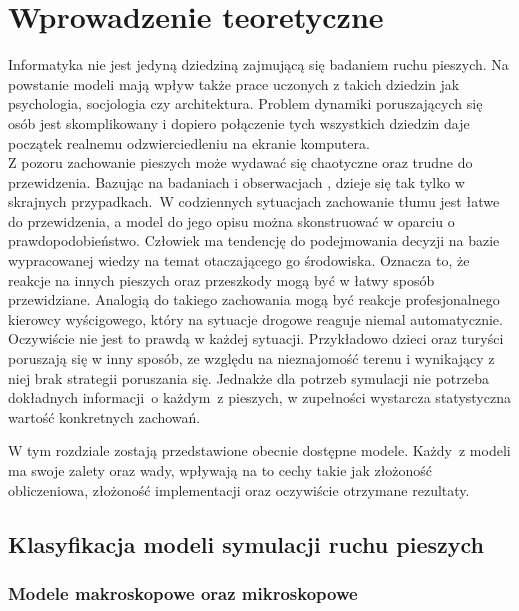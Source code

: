 \chapter{Wprowadzenie teoretyczne}
\label{cha:wprowadzenieTeoretyczne}

Informatyka nie jest jedyną dziedziną zajmującą się badaniem ruchu pieszych. Na powstanie modeli mają wpływ także prace uczonych z takich dziedzin jak psychologia, socjologia czy architektura. Problem dynamiki poruszających się osób jest skomplikowany i dopiero połączenie tych wszystkich dziedzin daje początek realnemu odzwierciedleniu na ekranie komputera. \\
Z pozoru zachowanie pieszych może wydawać się chaotyczne oraz trudne do przewidzenia. Bazując na badaniach i obserwacjach \cite{SforceModelForPedDyn}, dzieje się tak tylko w skrajnych przypadkach.~W codziennych sytuacjach zachowanie tłumu jest łatwe do przewidzenia, a model do jego opisu można skonstruować w oparciu o prawdopodobieństwo. Człowiek ma tendencję do podejmowania decyzji na bazie wypracowanej wiedzy na temat otaczającego go środowiska. Oznacza to, że reakcje na innych pieszych oraz przeszkody mogą być w łatwy sposób przewidziane. Analogią do takiego zachowania mogą być reakcje profesjonalnego kierowcy wyścigowego, który na sytuacje drogowe reaguje niemal automatycznie.\\

Oczywiście nie jest to prawdą w każdej sytuacji. Przykładowo dzieci oraz turyści poruszają się w inny sposób, ze względu na nieznajomość terenu i wynikający z niej brak strategii poruszania się. Jednakże dla potrzeb symulacji nie potrzeba dokładnych informacji~o każdym~z pieszych, w zupełności wystarcza statystyczna wartość konkretnych zachowań.

W tym rozdziale zostają przedstawione obecnie dostępne modele. Każdy~z modeli ma swoje zalety oraz wady, wpływają na to cechy takie jak złożoność obliczeniowa, złożoność implementacji oraz oczywiście  otrzymane rezultaty.

\section{Klasyfikacja modeli symulacji ruchu pieszych}
\label{sec:klasyfikacja}

\subsection{Modele makroskopowe oraz mikroskopowe}

